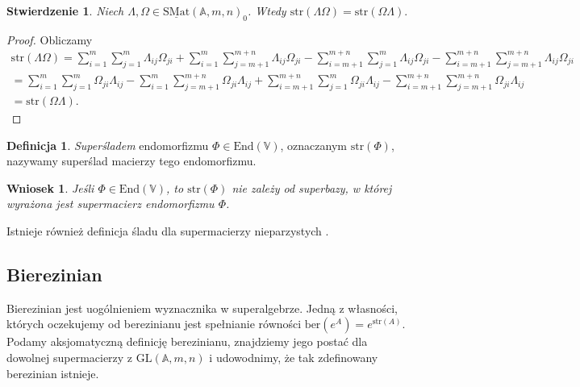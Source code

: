 \documentclass[11pt,a4paper]{report}
\newtheorem{corollary}[theorem]{Wniosek}
\newtheorem{proposition}[theorem]{Stwierdzenie}
\theoremstyle{definition}
\newtheorem{definition}[theorem]{Definicja}
\newcommand{\str}{\mathrm{str}}
\newcommand{\ber}{\mathrm{ber}}
\begin{document}
\begin{proposition}
 Niech $\Lambda, \Omega \in \underline{\mathrm{SMat}}(\mathbb{A},m,n)_0$. Wtedy $\str(\Lambda \Omega)= \str(\Omega \Lambda).$
\end{proposition}

\begin{proof}
 Obliczamy \begin{equation*}
 \begin{aligned}
    \str(\Lambda \Omega) = \sum^{m}_{i=1} \sum^{m}_{j=1} \Lambda_{ij} \Omega_{ji} + \sum^{m}_{i=1} \sum^{m+n}_{j=m+1} \Lambda_{ij} \Omega_{ji} - \sum^{m+n}_{i=m+1} \sum^{m}_{j=1} \Lambda_{ij} \Omega_{ji} - \sum^{m+n}_{i=m+1} \sum^{m+n}_{j=m+1} \Lambda_{ij} \Omega_{ji} \\
    = \sum^{m}_{i=1} \sum^{m}_{j=1} \Omega_{ji} \Lambda_{ij}  - \sum^{m}_{i=1} \sum^{m+n}_{j=m+1} \Omega_{ji} \Lambda_{ij} + \sum^{m+n}_{i=m+1} \sum^{m}_{j=1} \Omega_{ji} \Lambda_{ij} - \sum^{m+n}_{i=m+1} \sum^{m+n}_{j=m+1} \Omega_{ji} \Lambda_{ij} \\
    = \str(\Omega \Lambda).
 \end{aligned}
 \end{equation*}
\end{proof}

\begin{definition}
\textit{Superśladem} endomorfizmu $\Phi \in \mathrm{End}(\mathbb{V})$, oznaczanym $\str(\Phi)$, nazywamy superślad macierzy tego endomorfizmu.
\end{definition}

\begin{corollary}
 Jeśli $\Phi \in \mathrm{End}(\mathbb{V})$, to $\str(\Phi)$ nie zależy od superbazy, w której wyrażona jest supermacierz endomorfizmu $\Phi$.
\end{corollary}

Istnieje również definicja śladu dla supermacierzy nieparzystych \cite{leites}.

\subsection{Bierezinian}

Bierezinian jest uogólnieniem wyznacznika w superalgebrze. Jedną z własności, których oczekujemy od berezinianu jest spełnianie równości $\ber (e^{A}) = e^{\str (A)}.$ Podamy aksjomatyczną definicję berezinianu, znajdziemy jego postać dla dowolnej supermacierzy z $\mathrm{GL}(\mathbb{A},m,n)$ i udowodnimy, że tak zdefinowany berezinian istnieje.
\end{document}
